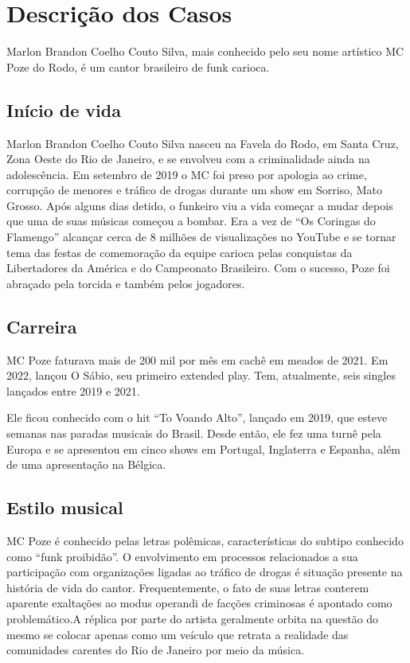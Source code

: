 \chapter{Descrição dos Casos}
\label{chap5}

Marlon Brandon Coelho Couto Silva, mais conhecido pelo seu nome artístico MC Poze do Rodo, é um cantor brasileiro de funk carioca.

\section{Início de vida}

Marlon Brandon Coelho Couto Silva nasceu na Favela do Rodo, em Santa Cruz, Zona Oeste do Rio de Janeiro, e se envolveu com a criminalidade ainda na adolescência. Em setembro de 2019 o MC foi preso por apologia ao crime, corrupção de menores e tráfico de drogas durante um show em Sorriso, Mato Grosso. Após alguns dias detido, o funkeiro viu a vida começar a mudar depois que uma de suas músicas começou a bombar. Era a vez de ``Os Coringas do Flamengo'' alcançar cerca de 8 milhões de visualizações no YouTube e se tornar tema das festas de comemoração da equipe carioca pelas conquistas da Libertadores da América e do Campeonato Brasileiro. Com o sucesso, Poze foi abraçado pela torcida e também pelos jogadores.

\section{Carreira}

MC Poze faturava mais de 200 mil por mês em cachê em meados de 2021. Em 2022, lançou O Sábio, seu primeiro extended play. Tem, atualmente, seis singles lançados entre 2019 e 2021.

Ele ficou conhecido com o hit ``To Voando Alto'', lançado em 2019, que esteve semanas nas paradas musicais do Brasil. Desde então, ele fez uma turnê pela Europa e se apresentou em cinco shows em Portugal, Inglaterra e Espanha, além de uma apresentação na Bélgica.

\section{Estilo musical}

MC Poze é conhecido pelas letras polêmicas, características do subtipo conhecido como ``funk proibidão''. O envolvimento em processos relacionados a sua participação com organizações ligadas ao tráfico de drogas é situação presente na história de vida do cantor. Frequentemente, o fato de suas letras conterem aparente exaltações ao modus operandi de facções criminosas é apontado como problemático.A réplica por parte do artista geralmente orbita na questão do mesmo se colocar apenas como um veículo que retrata a realidade das comunidades carentes do Rio de Janeiro por meio da música.
